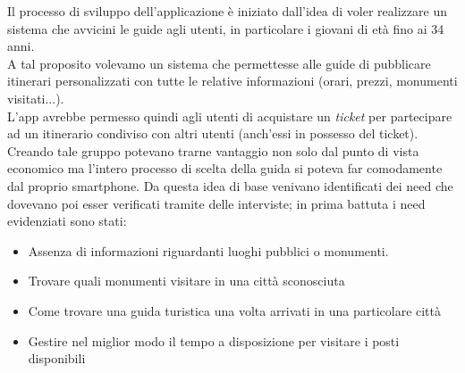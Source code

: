 Il processo di sviluppo dell'applicazione è iniziato dall'idea di voler realizzare un sistema che avvicini le guide agli utenti, in particolare i giovani di età fino ai 34 anni.\\
A tal proposito volevamo un sistema che permettesse alle guide di pubblicare itinerari personalizzati con tutte le relative informazioni (orari, prezzi, monumenti visitati...).\\
L'app avrebbe permesso quindi agli utenti di acquistare un \emph{ticket} per partecipare ad un itinerario condiviso con altri utenti (anch'essi in possesso del ticket). Creando tale gruppo potevano trarne vantaggio non solo dal punto di vista economico ma l'intero processo di scelta della guida si poteva far comodamente dal proprio smartphone.
Da questa idea di base venivano identificati dei need che dovevano poi esser verificati tramite delle interviste; in prima battuta i need evidenziati sono stati:
\begin{itemize}
	\item Assenza di informazioni riguardanti luoghi pubblici o monumenti.
	\item Trovare quali monumenti visitare in una città sconosciuta 
	\item Come trovare una guida turistica una volta arrivati in una particolare città
	\item Gestire nel miglior modo il tempo a disposizione per visitare i posti disponibili
	
\end{itemize}